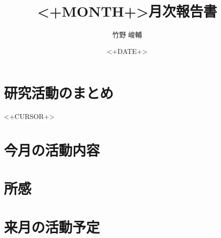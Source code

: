 \documentclass[twocolumn,uplatex]{jsarticle}
\begin{document}
\title{<+MONTH+>月次報告書} 
\author{竹野 峻輔}
\date{<+DATE+>} 
\maketitle

\section{研究活動のまとめ}

<+CURSOR+>

\section{今月の活動内容}

\section{所感}

\section{来月の活動予定} 
\end{document}
